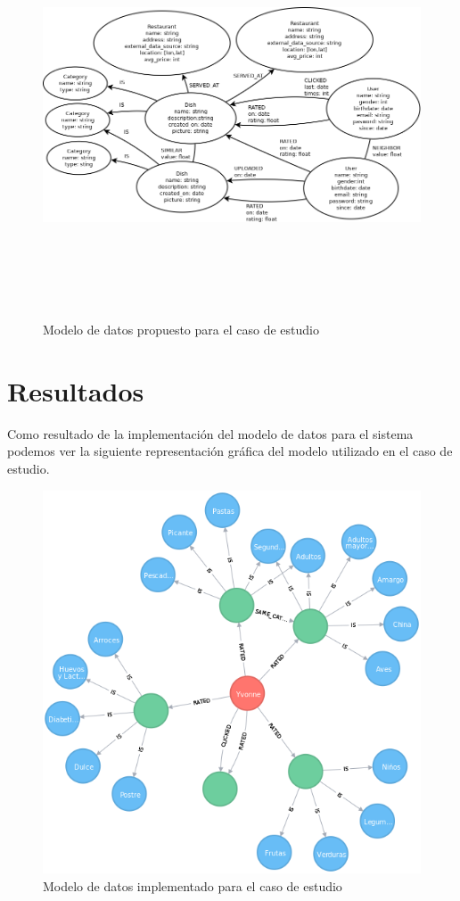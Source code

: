       \begin{landscape}
        \begin{figure}[h!]
          \centering
          \includegraphics[width=22.5cm,height=12cm]{./images/sc_data_model.png}
          \caption{Modelo de datos propuesto para el caso de estudio}
        \end{figure}
      \end{landscape}

  \section{Resultados}
    Como resultado de la implementación del modelo de datos para el sistema podemos ver la siguiente representación gráfica del modelo utilizado en el caso de estudio. 
            \begin{figure}[h!]
            \centering
            \includegraphics[width=12cm]{./images/graph}
            \caption{Modelo de datos implementado para el caso de estudio}
          \end{figure}

